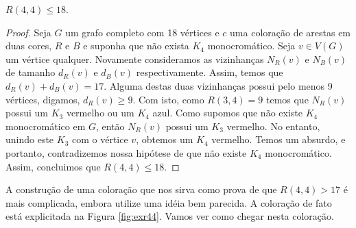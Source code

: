 \begin{theorem}
\label{thm:r44}
$R(4,4) \leq 18$.
\end{theorem}
\begin{proof}
Seja $G$ um grafo completo com 18 vértices e $c$ uma coloração de arestas em duas cores, $R$ e $B$ e suponha que não exista $K_4$ monocromático. Seja $v \in V(G)$ um vértice qualquer. Novamente consideramos as vizinhanças $N_R(v)$ e $N_B(v)$ de tamanho $d_R(v)$ e $d_B(v)$ respectivamente. Assim, temos que $d_R(v) + d_B(v) = 17$. Alguma destas duas vizinhanças possui pelo menos 9 vértices, digamos, $d_R(v) \geq 9$. Com isto, como $R(3,4) = 9$ temos que $N_R(v)$ possui um $K_3$ vermelho ou um $K_4$ azul. Como supomos que não existe $K_4$ monocromático em $G$, então $N_R(v)$ possui um $K_3$ vermelho.
No entanto, unindo este $K_3$ com o vértice $v$, obtemos um $K_4$ vermelho. Temos um absurdo, e portanto, contradizemos nossa hipótese de que não existe $K_4$ monocromático. Assim, concluimos que $R(4,4) \leq 18$.
\end{proof}

A construção de uma coloração que nos sirva como prova de que $R(4,4) > 17$ é mais complicada, embora utilize uma idéia bem parecida. A coloração de fato está explicitada na Figura \ref{fig:exr44}. Vamos ver como chegar nesta coloração.


